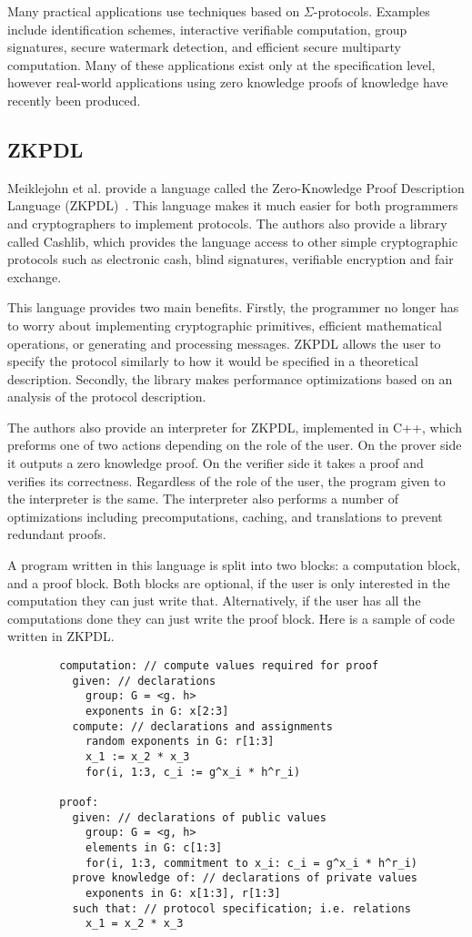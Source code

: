 \documentclass{sig-alternate}
\begin{document}
		Many practical applications use techniques based on $\Sigma$-protocols. Examples
		include identification schemes, interactive verifiable computation, group
		signatures, secure watermark detection, and efficient secure multiparty
		computation. Many of these applications exist only at the specification level,
		however real-world applications using zero knowledge proofs of knowledge have
		recently been produced.
		
	\subsection{ZKPDL}
		Meiklejohn et al. provide a language called the Zero-Knowledge Proof Description
		Language (ZKPDL)~\cite{ZKPDL:2010}. This language makes it much easier for both
		programmers and 	cryptographers to implement protocols. The authors also provide
		a library called Cashlib, which provides the language access to other simple
		cryptographic protocols such as electronic cash, blind signatures, verifiable
		encryption and fair exchange.
		
		This language provides two main benefits. Firstly, the programmer no longer 
		has to worry about implementing cryptographic primitives, efficient mathematical
		operations, or generating and processing messages. ZKPDL allows the user to
		specify the protocol similarly to how it would be specified in a theoretical
		description. Secondly, the library makes performance optimizations based on an
		analysis of the protocol description. 
		
		The authors also provide an interpreter for ZKPDL, implemented in C++, which
		preforms one of two actions depending on the role of the user. On the prover
		side it outputs a zero knowledge proof. On the verifier side it takes a proof
		and verifies its correctness. Regardless of the role of the user, the program
		given to the interpreter is the same. The interpreter also performs a number of
		optimizations including precomputations, caching, and translations to prevent
		redundant proofs. 
		
		A program written in this language is split into two blocks: a computation block,
		and a proof block. Both blocks are optional, if the user is only interested in the
		computation they can just write that. Alternatively, if the user has all the computations
		done they can just write the proof block. Here is a sample of code written in ZKPDL.
		
		\begin{verbatim}
		computation: // compute values required for proof
		  given: // declarations
		    group: G = <g. h>
		    exponents in G: x[2:3]
		  compute: // declarations and assignments
		    random exponents in G: r[1:3]
		    x_1 := x_2 * x_3
		    for(i, 1:3, c_i := g^x_i * h^r_i)
		    
		proof:
		  given: // declarations of public values
		    group: G = <g, h>
		    elements in G: c[1:3]
		    for(i, 1:3, commitment to x_i: c_i = g^x_i * h^r_i)
		  prove knowledge of: // declarations of private values
		    exponents in G: x[1:3], r[1:3]
		  such that: // protocol specification; i.e. relations
		    x_1 = x_2 * x_3
		\end{verbatim}
		
\end{document}
